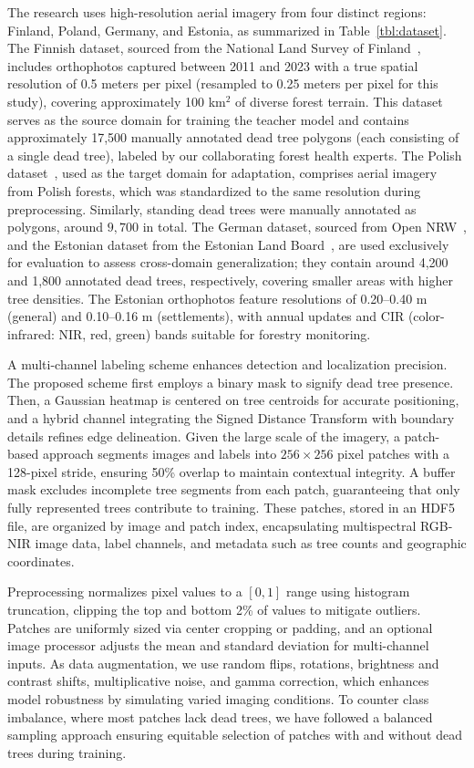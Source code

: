 \documentclass[twocolumn]{article}
\begin{document}
The research uses high-resolution aerial imagery from four distinct regions: Finland, Poland, Germany, and Estonia, as summarized in Table~\ref{tbl:dataset}. The Finnish dataset, sourced from the National Land Survey of Finland~\citep{nlsf2024}, includes orthophotos captured between 2011 and 2023 with a true spatial resolution of 0.5 meters per pixel (resampled to 0.25 meters per pixel for this study), covering approximately 100 km$^2$ of diverse forest terrain. This dataset serves as the source domain for training the teacher model and contains approximately 17,500 manually annotated dead tree polygons (each consisting of a single dead tree), labeled by our collaborating forest health experts. The Polish dataset~\citep{gugik_orto}, used as the target domain for adaptation, comprises aerial imagery from Polish forests, which was standardized to the same resolution during preprocessing. Similarly, standing dead trees were manually annotated as polygons, around $9,700$ in total. The German dataset, sourced from Open NRW~\citep{open_nrw_2024}, and the Estonian dataset from the Estonian Land Board~\citep{maaamet_2024}, are used exclusively for evaluation to assess cross-domain generalization; they contain around 4,200 and 1,800 annotated dead trees, respectively, covering smaller areas with higher tree densities. The Estonian orthophotos feature resolutions of 0.20--0.40 m (general) and 0.10--0.16 m (settlements), with annual updates and CIR (color-infrared: NIR, red, green) bands suitable for forestry monitoring.

A multi-channel labeling scheme enhances detection and localization precision. The proposed scheme first employs a binary mask to signify dead tree presence. Then, a Gaussian heatmap is centered on tree centroids for accurate positioning, and a hybrid channel integrating the Signed Distance Transform with boundary details refines edge delineation. Given the large scale of the imagery, a patch-based approach segments images and labels into $256 \times 256$ pixel patches with a 128-pixel stride, ensuring 50\% overlap to maintain contextual integrity. A buffer mask excludes incomplete tree segments from each patch, guaranteeing that only fully represented trees contribute to training. These patches, stored in an HDF5 file, are organized by image and patch index, encapsulating multispectral RGB-NIR image data, label channels, and metadata such as tree counts and geographic coordinates.

Preprocessing normalizes pixel values to a $[0, 1]$ range using histogram truncation, clipping the top and bottom 2\% of values to mitigate outliers. Patches are uniformly sized via center cropping or padding, and an optional image processor adjusts the mean and standard deviation for multi-channel inputs. As data augmentation, we use random flips, rotations, brightness and contrast shifts, multiplicative noise, and gamma correction, which enhances model robustness by simulating varied imaging conditions. To counter class imbalance, where most patches lack dead trees, we have followed a balanced sampling approach ensuring equitable selection of patches with and without dead trees during training.
\end{document}
